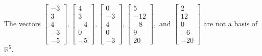 \begin{exercise}
\begin{exerciseStatement}
  \end{exerciseStatement}
  \begin{exerciseAnswer}
   The vectors \(\left[\begin{array}{r}
-3 \\
3 \\
4 \\
-3 \\
-5
\end{array}\right] , \left[\begin{array}{r}
4 \\
3 \\
-4 \\
0 \\
-5
\end{array}\right] , \left[\begin{array}{r}
0 \\
-3 \\
4 \\
0 \\
-3
\end{array}\right] , \left[\begin{array}{r}
5 \\
-12 \\
-8 \\
9 \\
20
\end{array}\right] , \text{ and } \left[\begin{array}{r}
2 \\
12 \\
0 \\
-6 \\
-20
\end{array}\right]\) 
  	 are not  a basis of \(\mathbb{R}^5\).
  


  \end{exerciseAnswer}
\end{exercise}